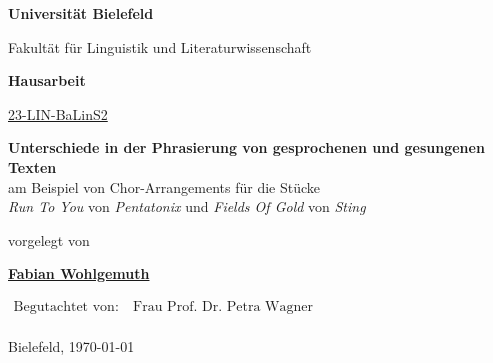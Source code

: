 \begin{center}

\Huge{\textbf{Universität Bielefeld}}

\LARGE{Fakultät für Linguistik und Literaturwissenschaft}

\vfill

\LARGE{\textbf{Hausarbeit}}

\Large

\href{https://ekvv.uni-bielefeld.de/sinfo/publ/modul/26797308}{23-LIN-BaLinS2}

\vfill


\vspace*{1cm}

\LARGE{\textbf{Unterschiede in der Phrasierung von gesprochenen und gesungenen Texten}\\\Large{am Beispiel von Chor-Arrangements für die Stücke\\\textit{Run To You} von \textit{Pentatonix} und \textit{Fields Of Gold} von \textit{Sting}}}

\Large

\vfill

vorgelegt von

\vspace*{1cm}

\textbf{\href{https://fabianwohlgemuth.de}{Fabian Wohlgemuth}}

\vfill

$\begin{aligned}
\text{Begutachtet von:}&\ \text{Frau Prof. Dr. Petra Wagner}\\
\end{aligned}$

\vfill

Bielefeld, \today
{}

\end{center}
\restoregeometry
